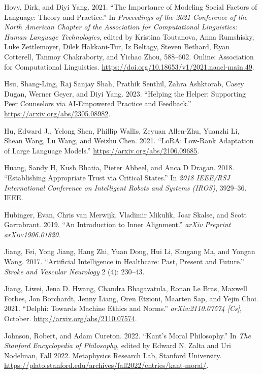 \documentclass[
  letterpaper,
  numbers=noenddot,
  DIV=11,
  oneside]{scrreprt}
\newlength{\cslhangindent}
\newenvironment{CSLReferences}[2] %
 {\begin{list}{}{%
  \setlength{\itemindent}{0pt}
  \setlength{\leftmargin}{0pt}
  \setlength{\parsep}{0pt}
  \ifodd #1
   \setlength{\leftmargin}{\cslhangindent}
   \setlength{\itemindent}{-1\cslhangindent}
  \fi
  \setlength{\itemsep}{#2\baselineskip}}}
 {\end{list}}
\theoremstyle{remark}
\begin{document}
\begin{CSLReferences}{1}{0}
Hovy, Dirk, and Diyi Yang. 2021. {``The Importance of Modeling Social
Factors of Language: Theory and Practice.''} In \emph{Proceedings of the
2021 Conference of the North American Chapter of the Association for
Computational Linguistics: Human Language Technologies}, edited by
Kristina Toutanova, Anna Rumshisky, Luke Zettlemoyer, Dilek Hakkani-Tur,
Iz Beltagy, Steven Bethard, Ryan Cotterell, Tanmoy Chakraborty, and
Yichao Zhou, 588--602. Online: Association for Computational
Linguistics. \url{https://doi.org/10.18653/v1/2021.naacl-main.49}.

Hsu, Shang-Ling, Raj Sanjay Shah, Prathik Senthil, Zahra Ashktorab,
Casey Dugan, Werner Geyer, and Diyi Yang. 2023. {``Helping the Helper:
Supporting Peer Counselors via AI-Empowered Practice and Feedback.''}
\url{https://arxiv.org/abs/2305.08982}.

Hu, Edward J., Yelong Shen, Phillip Wallis, Zeyuan Allen-Zhu, Yuanzhi
Li, Shean Wang, Lu Wang, and Weizhu Chen. 2021. {``LoRA: Low-Rank
Adaptation of Large Language Models.''}
\url{https://arxiv.org/abs/2106.09685}.

Huang, Sandy H, Kush Bhatia, Pieter Abbeel, and Anca D Dragan. 2018.
{``Establishing Appropriate Trust via Critical States.''} In \emph{2018
IEEE/RSJ International Conference on Intelligent Robots and Systems
(IROS)}, 3929--36. IEEE.

Hubinger, Evan, Chris van Merwijk, Vladimir Mikulik, Joar Skalse, and
Scott Garrabrant. 2019. {``An Introduction to Inner Alignment.''}
\emph{arXiv Preprint arXiv:1906.01820}.

Jiang, Fei, Yong Jiang, Hang Zhi, Yuan Dong, Hui Li, Shugang Ma, and
Yongan Wang. 2017. {``Artificial Intelligence in Healthcare: Past,
Present and Future.''} \emph{Stroke and Vascular Neurology} 2 (4):
230--43.

Jiang, Liwei, Jena D. Hwang, Chandra Bhagavatula, Ronan Le Bras, Maxwell
Forbes, Jon Borchardt, Jenny Liang, Oren Etzioni, Maarten Sap, and Yejin
Choi. 2021. {``Delphi: {Towards} {Machine} {Ethics} and {Norms}.''}
\emph{arXiv:2110.07574 {[}Cs{]}}, October.
\url{http://arxiv.org/abs/2110.07574}.

Johnson, Robert, and Adam Cureton. 2022. {``Kant's {Moral}
{Philosophy}.''} In \emph{The {Stanford} {Encyclopedia} of
{Philosophy}}, edited by Edward N. Zalta and Uri Nodelman, Fall 2022.
Metaphysics Research Lab, Stanford University.
\url{https://plato.stanford.edu/archives/fall2022/entries/kant-moral/}.


\end{CSLReferences}
\end{document}
